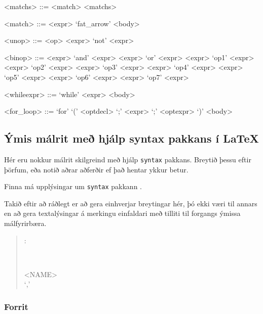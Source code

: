 \documentclass[12pt,a4paper]{article}
\newenvironment{repnull}[0]{%
	\begin{stack}
	\\
	\begin{rep}
}{%
	\end{rep}
	\end{stack}
}
\newenvironment{málrit}[1]{%
	\par\noindent\begin{minipage}{\linewidth}\vspace{0.5em}\begin{quote}\noindent%
	\hspace*{-2em}\synt{#1}:\hfill\par%
	\noindent%
	\begin{minipage}{\linewidth}\begin{syntdiag}%
}{%
	\end{syntdiag}\end{minipage}\end{quote}\end{minipage}%
}
\begin{document}
\begin{grammar}
<matchs> ::= <match> <matchs>
	\alt \epsilon
\end{grammar}

\begin{grammar}
<match> ::= <expr> `fat_arrow' <body> 
\end{grammar}

\begin{grammar}
<unop> ::= <op> <expr>
	\alt `not' <expr>
\end{grammar}

\begin{grammar}
<binop> ::= <expr> `and' <expr>
	\alt <expr> `or' <expr>
	\alt <expr> `op1' <expr>
	\alt <expr> `op2' <expr>
	\alt <expr> `op3' <expr>
	\alt <expr> `op4' <expr>
	\alt <expr> `op5' <expr>
	\alt <expr> `op6' <expr>
	\alt <expr> `op7' <expr>
\end{grammar}

\begin{grammar}
<whileexpr> ::= `while' <expr> <body> 
\end{grammar}

\begin{grammar}
<for_loop> ::= `for' `(' <optdecl> `;' <expr> `;' <optexpr> `)' <body> 
\end{grammar}

\subsection{Ýmis málrit með hjálp syntax pakkans í LaTeX}

Hér eru nokkur málrit skilgreind með hjálp {\tt syntax} pakkans.
Breytið þessu eftir þörfum, eða notið aðrar
aðferðir ef það hentar ykkur betur.

Finna má upplýsingar um {\tt syntax} pakkann
.

Takið eftir að ráðlegt er að gera einhverjar breytingar hér,
þó ekki væri til annars en að gera textalýsingar á merkingu
einfaldari með tilliti til forgangs ýmissa málfyrirbæra.

\begin{málrit}{parameter_list}
	\begin{repnull}
		<NAME> 
	\\
		`,'  
	\end{repnull}
\end{málrit}%

\subsubsection{Forrit}
\end{document}
